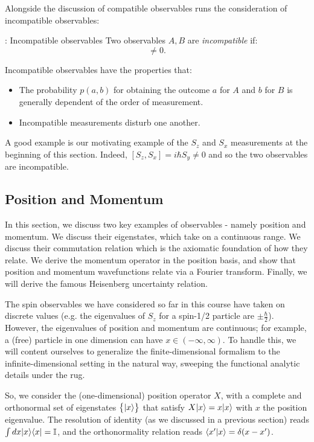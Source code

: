 Alongside the discussion of compatible observables runs the consideration of incompatible observables:

\begin{defbox}{: Incompatible observables}
    Two observables $A, B$ are \emph{incompatible} if:
    \begin{equation}
        [A, B] \neq 0.
    \end{equation}
\end{defbox}
Incompatible observables have the properties that: 
\begin{itemize}
    \item The probability $p(a, b)$ for obtaining the outcome $a$ for $A$ and $b$ for $B$ is generally dependent of the order of measurement.
    \item Incompatible measurements disturb one another.
\end{itemize}
A good example is our motivating example of the $S_z$ and $S_x$ measurements at the beginning of this section. Indeed, $[S_z, S_x] = i\hbar S_y \neq 0$ and so the two observables are incompatible.  

\subsection{Position and Momentum}
In this section, we discuss two key examples of observables - namely position and momentum. We discuss their eigenstates, which take on a continuous range. We discuss their commutation relation which is the axiomatic foundation of how they relate. We derive the momentum operator in the position basis, and show that position and momentum wavefunctions relate via a Fourier transform. Finally, we will derive the famous Heisenberg uncertainty relation.

The spin observables we have considered so far in this course have taken on discrete values (e.g. the eigenvalues of $S_z$ for a spin-1/2 particle are $\pm \frac{\hbar}{2}$). However, the eigenvalues of position and momentum are continuous; for example, a (free) particle in one dimension can have $x \in (-\infty, \infty)$. To handle this, we will content ourselves to generalize the finite-dimensional formalism to the infinite-dimensional setting in the natural way, sweeping the functional analytic details under the rug.

So, we consider the (one-dimensional) position operator $X$, with a complete and orthonormal set of eigenstates $\set{\lvert x \rangle}$ that satisfy $X\lvert x \rangle = x\lvert x \rangle$ with $x$ the position eigenvalue. The resolution of identity (as we discussed in a previous section) reads $\int dx \lvert x \rangle \langle x \rvert = \mathbb{I}$, and the orthonormality relation reads $\langle x' \lvert x \rangle = \delta(x - x')$. 

